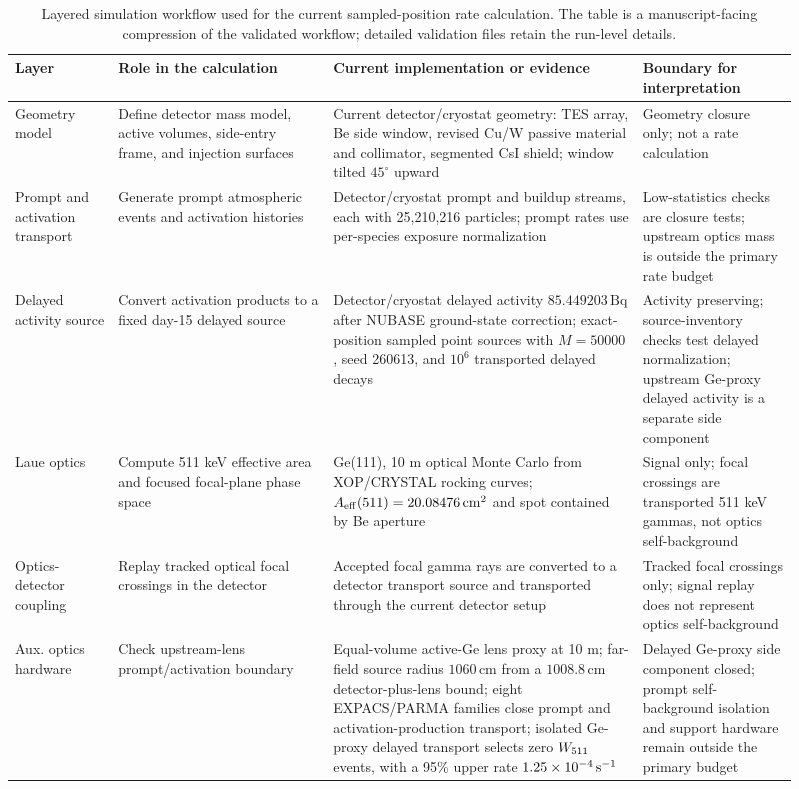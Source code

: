 \begin{table}[t]
\centering
\caption{Layered simulation workflow used for the current sampled-position rate calculation. The table is a manuscript-facing compression of the validated workflow; detailed validation files retain the run-level details.}
\label{tab:simulation_workflow}
\begingroup
\setlength{\tabcolsep}{2pt}
\renewcommand{\arraystretch}{0.78}
\tiny
\begin{tabular}{@{}p{0.12\linewidth}p{0.25\linewidth}p{0.36\linewidth}p{0.18\linewidth}@{}}
\toprule
Layer & Role in the calculation & Current implementation or evidence & Boundary for interpretation \\
\midrule
Geometry model & Define detector mass model, active volumes, side-entry frame, and injection surfaces & Current detector/cryostat geometry: TES array, Be side window, revised Cu/W passive material and collimator, segmented CsI shield; window tilted $45^\circ$ upward & Geometry closure only; not a rate calculation \\
Prompt and activation transport & Generate prompt atmospheric events and activation histories & Detector/cryostat prompt and buildup streams, each with 25,210,216 particles; prompt rates use per-species exposure normalization & Low-statistics checks are closure tests; upstream optics mass is outside the primary rate budget \\
Delayed activity source & Convert activation products to a fixed day-15 delayed source & Detector/cryostat delayed activity $85.449203\,\mathrm{Bq}$ after NUBASE ground-state correction; exact-position sampled point sources with $M=50000$, seed 260613, and $10^6$ transported delayed decays & Activity preserving; source-inventory checks test delayed normalization; upstream Ge-proxy delayed activity is a separate side component \\
Laue optics & Compute 511 keV effective area and focused focal-plane phase space & Ge(111), 10 m optical Monte Carlo from XOP/CRYSTAL rocking curves; $A_{\mathrm{eff}}(511)=20.08476\,\mathrm{cm^2}$ and spot contained by Be aperture & Signal only; focal crossings are transported 511 keV gammas, not optics self-background \\
Optics-detector coupling & Replay tracked optical focal crossings in the detector & Accepted focal gamma rays are converted to a detector transport source and transported through the current detector setup & Tracked focal crossings only; signal replay does not represent optics self-background \\
Aux. optics hardware & Check upstream-lens prompt/activation boundary & Equal-volume active-Ge lens proxy at 10 m; far-field source radius $1060\,\mathrm{cm}$ from a $1008.8\,\mathrm{cm}$ detector-plus-lens bound; eight EXPACS/PARMA families close prompt and activation-production transport; isolated Ge-proxy delayed transport selects zero $W_{511}$ events, with a 95\% upper rate $1.25\times10^{-4}\,\mathrm{s^{-1}}$ & Delayed Ge-proxy side component closed; prompt self-background isolation and support hardware remain outside the primary budget \\

\end{tabular}
\end{table}
